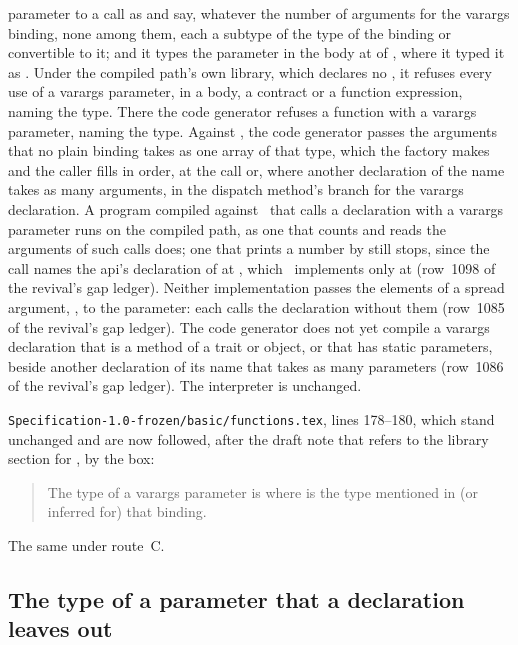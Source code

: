 \begin{description}
parameter to a call as  and
 say, whatever the number of
arguments for the varargs binding, none among them, each a subtype of the type
of the binding or convertible to it; and it types the parameter in the body at
 of \library,
where it typed it as .
Under the compiled path's own library, which declares no ,
it refuses every use of a varargs parameter, in a body, a contract or a
function expression, naming the type.
There the code generator refuses a function with a varargs parameter, naming
the type.
Against \library, the code generator passes the arguments that no plain
binding takes as one array of that type, which the factory
 makes and the caller fills in order, at the call
or, where another declaration of the name takes as many arguments, in the
dispatch method's branch for the varargs declaration.
A program compiled against \library\ that calls a declaration with a varargs
parameter runs on the compiled path, as one that counts and reads the
arguments of such calls does; one that prints a number by  still
stops, since the call names the api's declaration of  at
, which \library\ implements only at  (row~1098 of the
revival's gap ledger).
Neither implementation passes the elements of a spread argument,
, to the parameter: each calls the declaration
without them (row~1085 of the revival's gap ledger).
The code generator does not yet compile a varargs declaration that is a
method of a trait or object, or that has static parameters, beside another
declaration of its name that takes as many parameters (row~1086 of the
revival's gap ledger).
The interpreter is unchanged.
\item[Original text] \nolinkurl{Specification-1.0-frozen/basic/functions.tex},
lines 178--180, which stand unchanged and are now followed, after the draft
note that refers to the library section for , by the box:
\begin{quote}
The type of a varargs parameter
is  where  is
the type mentioned in (or inferred for) that binding.
\end{quote}
\item[Route C] The same under route~C.
\end{description}

\subsection{The type of a parameter that a declaration leaves out}

